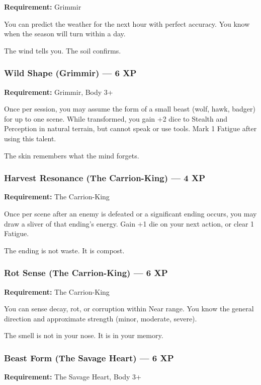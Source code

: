 \textbf{Requirement:} Grimmir

You can predict the weather for the next hour with perfect accuracy. You know when the season will turn within a day.

The wind tells you. The soil confirms.

\subsubsection{Wild Shape (Grimmir) — 6 XP}

\textbf{Requirement:} Grimmir, Body 3+

Once per session, you may assume the form of a small beast (wolf, hawk, badger) for up to one scene. While transformed, you gain +2 dice to Stealth and Perception in natural terrain, but cannot speak or use tools. Mark 1 Fatigue after using this talent.

The skin remembers what the mind forgets.

\subsubsection{Harvest Resonance (The Carrion-King) — 4 XP}

\textbf{Requirement:} The Carrion-King

Once per scene after an enemy is defeated or a significant ending occurs, you may draw a sliver of that ending's energy. Gain +1 die on your next action, or clear 1 Fatigue.

The ending is not waste. It is compost.

\subsubsection{Rot Sense (The Carrion-King) — 6 XP}

\textbf{Requirement:} The Carrion-King

You can sense decay, rot, or corruption within Near range. You know the general direction and approximate strength (minor, moderate, severe).

The smell is not in your nose. It is in your memory.

\subsubsection{Beast Form (The Savage Heart) — 6 XP}

\textbf{Requirement:} The Savage Heart, Body 3+

